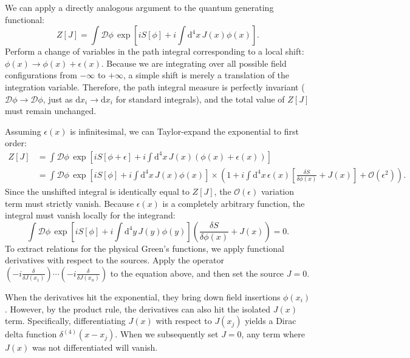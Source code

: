 We can apply a directly analogous argument to the quantum generating functional:
\[
    Z[J] = \int \mathcal{D}\phi \, \exp\left[ iS[\phi] + i\int \mathrm{d}^4x \, J(x)\phi(x) \right].
\]
Perform a change of variables in the path integral corresponding to a local shift: $\phi(x) \to \phi(x) + \epsilon(x)$. Because we are integrating over all possible field configurations from $-\infty$ to $+\infty$, a simple shift is merely a translation of the integration variable. Therefore, the path integral measure is perfectly invariant ($\mathcal{D}\phi \to \mathcal{D}\phi$, just as $\mathrm{d}x_i \to \mathrm{d}x_i$ for standard integrals), and the total value of $Z[J]$ must remain unchanged.

Assuming $\epsilon(x)$ is infinitesimal, we can Taylor-expand the exponential to first order:
\[
    \begin{aligned}
        Z[J] & = \int \mathcal{D}\phi \, \exp\left[ iS[\phi + \epsilon] + i\int \mathrm{d}^4x \, J(x)(\phi(x) + \epsilon(x)) \right]                                                                                                                     \\
             & = \int \mathcal{D}\phi \, \exp\left[ iS[\phi] + i\int \mathrm{d}^4x \, J(x)\phi(x) \right] \times \left( 1 + i \int \mathrm{d}^4x \, \epsilon(x) \left[ \frac{\delta S}{\delta \phi(x)} + J(x) \right] + \mathcal{O}(\epsilon^2) \right).
    \end{aligned}
\]
Since the unshifted integral is identically equal to $Z[J]$, the $\mathcal{O}(\epsilon)$ variation term must strictly vanish. Because $\epsilon(x)$ is a completely arbitrary function, the integral must vanish locally for the integrand:
\[
    \int \mathcal{D}\phi \, \exp\left[ iS[\phi] + i\int \mathrm{d}^4y \, J(y)\phi(y) \right] \left( \frac{\delta S}{\delta \phi(x)} + J(x) \right) = 0.
\]
To extract relations for the physical Green's functions, we apply functional derivatives with respect to the sources. Apply the operator $\left(-i \frac{\delta}{\delta J(x_1)}\right) \cdots \left(-i \frac{\delta}{\delta J(x_n)}\right)$ to the equation above, and then set the source $J=0$.

When the derivatives hit the exponential, they bring down field insertions $\phi(x_i)$. However, by the product rule, the derivatives can also hit the isolated $J(x)$ term. Specifically, differentiating $J(x)$ with respect to $J(x_j)$ yields a Dirac delta function $\delta^{(4)}(x - x_j)$. When we subsequently set $J=0$, any term where $J(x)$ was not differentiated will vanish.

